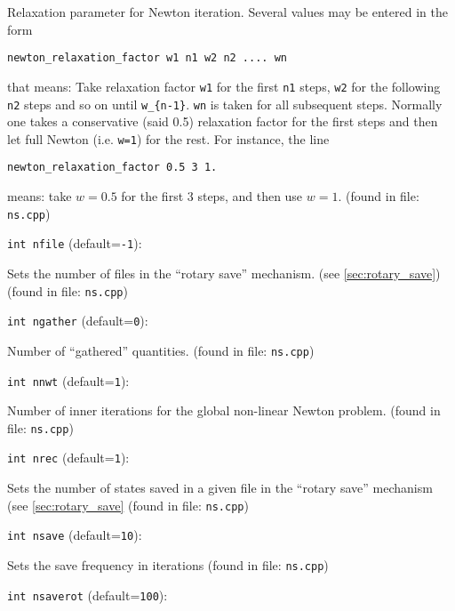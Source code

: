 Relaxation parameter for Newton iteration. Several
values may be entered in the form
%
\begin{verbatim} 
newton_relaxation_factor w1 n1 w2 n2 .... wn
\end{verbatim}
%
that means: Take relaxation factor \verb+w1+
for the first \verb+n1+ steps, \verb+w2+ for the following \verb+n2+ steps
and so on until \verb+w_{n-1}+. \verb+wn+ is taken for all subsequent 
steps. Normally one takes a conservative (said 0.5) relaxation
factor for the first steps and then let full Newton (i.e. \verb+w=1+)
for the rest. For instance, the line  
%
\begin{verbatim} 
newton_relaxation_factor 0.5 3 1.
\end{verbatim}
%
means: take $w=0.5$ for the first 3 steps, and then use $w=1$. 
 (found in file: \verb+ns.cpp+)
\item\verb+int nfile+ {\rm(default=\verb|-1|)}:

Sets the number of files in the ``rotary save'' mechanism. 
(see \ref{sec:rotary_save})
 (found in file: \verb+ns.cpp+)
\item\verb+int ngather+ {\rm(default=\verb|0|)}:

Number of ``gathered'' quantities.
 (found in file: \verb+ns.cpp+)
\item\verb+int nnwt+ {\rm(default=\verb|1|)}:

Number of inner iterations for the global non-linear
Newton  problem. 
 (found in file: \verb+ns.cpp+)
\item\verb+int nrec+ {\rm(default=\verb|1|)}:

Sets the number of states saved in a given file
in the ``rotary save'' mechanism (see \ref{sec:rotary_save}
 (found in file: \verb+ns.cpp+)
\item\verb+int nsave+ {\rm(default=\verb|10|)}:

Sets the save frequency in iterations 
 (found in file: \verb+ns.cpp+)
\item\verb+int nsaverot+ {\rm(default=\verb|100|)}:

